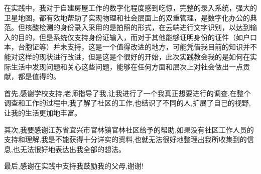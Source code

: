 \documentclass[AutoFakeBold]{LZUThesis}
\begin{document}
在实践中，我对于自建房屋工作的数字化程度感到吃惊，完整的录入系统，强大的卫星地图，都有效地帮助了实现物理和社会层面上的双重管理，是数字化办公的典范。但核酸检测的身份录入采用的是拍照的形式，在云端进行文字识别，以达到输入的目的，但是系统仅支持身份证输入，而对于其他能够证明身份的证件（如户口本，台胞证等）并未支持，这是一个值得改进的地方，可能凭借我目前的知识并不能对这样的现状进行改进，但是这是个很好的开始，此次实践教会我的是如何在实际生活中发现问题和关心这些问题，能够在任何方面和层次上对社会做出一点贡献，都是值得的。







\backmatter
\Thanks
首先,感谢学校支持,老师指导了我,让我进行了一个我真正想要进行的调查,在整个调查和工作的过程中,我了解了社区的工作,也结识了不同的人,扩展了自己的视野,让我的生活更加地丰富。

其次,我要感谢江苏省宜兴市官林镇官林社区给予的帮助,如果没有社区工作人员的支持和理解,我是不能获得十分详实的资料,也就无法很好地整理出我所收集到的信息,也无法很好地表达出我全部的想法。

最后,感谢在实践中支持我鼓励我的父母,谢谢!
\end{document}
